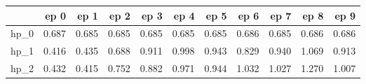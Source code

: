 \begin{tabular}{lrrrrrrrrrr}
\toprule
{} &   ep 0 &   ep 1 &   ep 2 &   ep 3 &   ep 4 &   ep 5 &   ep 6 &   ep 7 &   ep 8 &   ep 9 \\
\midrule
hp\_0 &  0.687 &  0.685 &  0.685 &  0.685 &  0.685 &  0.685 &  0.686 &  0.685 &  0.686 &  0.686 \\
hp\_1 &  0.416 &  0.435 &  0.688 &  0.911 &  0.998 &  0.943 &  0.829 &  0.940 &  1.069 &  0.913 \\
hp\_2 &  0.432 &  0.415 &  0.752 &  0.882 &  0.971 &  0.944 &  1.032 &  1.027 &  1.270 &  1.007 \\
\bottomrule
\end{tabular}
